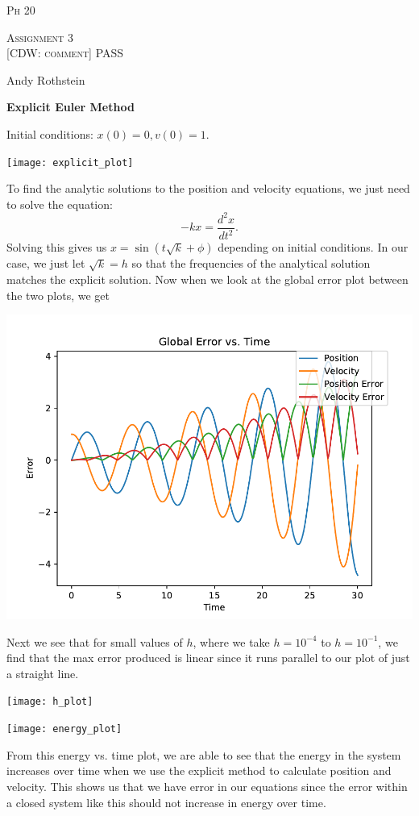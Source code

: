 \documentclass[10pt]{report}
\newcommand{\cdw}[1]
           {{\color{blue} [CDW: comment] #1}}
\begin{document}
\begin{center}\textsc{\Large Ph 20}

  \textsc{\large Assignment 3
  \\\cdw{PASS}}

\end{center}
Andy Rothstein

\bigskip

\noindent\textbf{Explicit Euler Method}

Initial conditions: $x(0)=0, v(0)=1$.

\texttt{[image: explicit\_plot]}

To find the analytic solutions to the position and velocity equations, we just need to solve the equation:
$$-kx=\frac{d^2x}{dt^2}.$$
Solving this gives us $x=\sin(t\sqrt k+\phi)$ depending on initial conditions. In our case, we just let $\sqrt k=h$ so that the frequencies of the analytical solution matches the explicit solution. Now when we look at the global error plot between the two plots, we get

\includegraphics[scale = .85]{error_plot}

Next we see that for small values of $h$, where we take $h=10^{-4}$ to $h=10^{-1}$, we find that the max error produced is linear since it runs parallel to our plot of just a straight line. 

\texttt{[image: h\_plot]}

\texttt{[image: energy\_plot]}

From this  energy vs. time plot, we are able to see that the energy in the system increases over time when we use the explicit method to calculate position and velocity. This shows us that we have error in our equations since the error within a closed system like this should not increase in energy over time. 
\end{document}
